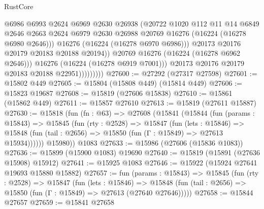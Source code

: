 \begin{lexlean}{RustCore}
\begin{coremodule}
                                @6986
                                @6993
                                @2624
                                @6969
                                @2630
                                @26938
                                (@20722
                                  @1020
                                  @112
                                  @11
                                  @14
                                  @6849
                                  @2646
                                  @2663
                                  @2624
                                  @6979
                                  @2630
                                  @26988
                                  @20769
                                  @16276
                                  (@16224 (@16278 @6980 @2646)))
                                @16276
                                (@16224 (@16278 @6970 @6986)))
                              @20173
                              @20176
                              @20179
                              @20183
                              @20188
                              @20194))
                          @20769
                          @16276
                          (@16224 (@16278 @6962 @2646)))
                        @16276
                        (@16224 (@16278 @6919 @7001)))
                      @20173
                      @20176
                      @20179
                      @20183
                      @20188
                      @22951)))))))))
@27600 := @27292 (@27317 @27598)
@27601 := @15802 @449
@27605 := @15804 (@15808 @449) (@15814 @449)
@27606 := @15823 @19687
@27608 := @15819 (@27606 @15838)
@27610 := @15861 (@15862 @449)
@27611 := @15857 @27610
@27613 := @15819 (@27611 @15887)
@27630 := @15818
    (fun (fn : @63) =>
    @27608
      (@15841
        (@15844
          (fun (params : @15843) =>
          @15845
            (fun (rty : @2528) =>
            @15847
              (fun (lets : @15846) =>
              @15848 (fun (tail : @2656) => @15850 (fun (Γ : @15849) => @27613 @15934))))))
        @15980))
    @1083
@27633 := @15986 (@27606 (@15836 @1083))
@27636 := @15899 (@15900 @1083) @19690
@27640 := @15819 (@15891 (@27636 @15908) @15912)
@27641 := @15925 @1083
@27646 := @15922 (@15924 @27641 @19693 @15880 @15882)
@27657 := fun (params : @15843) =>
  @15845
    (fun (rty : @2528) =>
    @15847
      (fun (lets : @15846) =>
      @15848 (fun (tail : @2656) => @15850 (fun (Γ : @15849) => @27613 (@27640 @27646)))))
@27658 := @15844 @27657
@27659 := @15841 @27658

\end{coremodule}
\end{lexlean}
